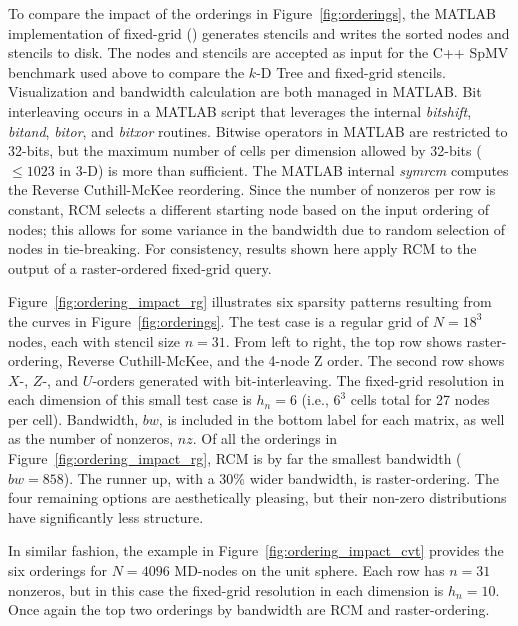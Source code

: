 \documentclass{report}
\begin{document}
To compare the impact of the orderings in Figure~\ref{fig:orderings}, the MATLAB implementation of fixed-grid (\cite{BolligRBFFixedGrid}) generates stencils and writes the sorted nodes and stencils to disk. The nodes and stencils are accepted as input for the C++ SpMV benchmark used above to compare 
the $k$-D Tree and fixed-grid stencils. Visualization and bandwidth calculation are both managed in MATLAB. 
Bit interleaving occurs in a MATLAB script that leverages the internal \emph{bitshift}, \emph{bitand}, \emph{bitor}, and \emph{bitxor} routines. Bitwise operators in MATLAB are restricted to 32-bits, but the maximum number of cells per dimension allowed by 32-bits ($\leq 1023$ in $3$-D) is more than sufficient. The MATLAB internal \emph{symrcm} computes the Reverse Cuthill-McKee reordering. %
Since the number of nonzeros per row is constant, RCM selects a different starting node based on the input ordering of nodes; this allows for some variance in the bandwidth due to random selection of nodes in tie-breaking. For consistency, results shown here apply RCM to the output of a raster-ordered fixed-grid query. 

Figure~\ref{fig:ordering_impact_rg} illustrates six sparsity patterns resulting from the curves in Figure~\ref{fig:orderings}. The test case is a regular grid of $N=18^3$ nodes, each with stencil size $n=31$. From left to right, the top row shows raster-ordering, Reverse Cuthill-McKee, and the 4-node Z order. The second row shows $X$-, $Z$-, and $U$-orders generated with bit-interleaving. The fixed-grid resolution in each dimension of this small test case is $h_n = 6$ (i.e., $6^3$ cells total for 27 nodes per cell). Bandwidth, $bw$, is included in the bottom label for each matrix, as well as the number of nonzeros, $nz$. Of all the orderings in Figure~\ref{fig:ordering_impact_rg}, RCM is by far the smallest bandwidth ($bw=858$). The runner up, with a 30\% wider bandwidth, is raster-ordering.  The four remaining options are aesthetically pleasing, but their non-zero distributions have significantly less structure. 

In similar fashion, the example in Figure~\ref{fig:ordering_impact_cvt} provides the six orderings for $N=4096$ MD-nodes on the unit sphere. Each row has $n=31$ nonzeros, but in this case the fixed-grid resolution in each dimension is $h_n = 10$. Once again the top two orderings by bandwidth are RCM and raster-ordering. 
\end{document}
